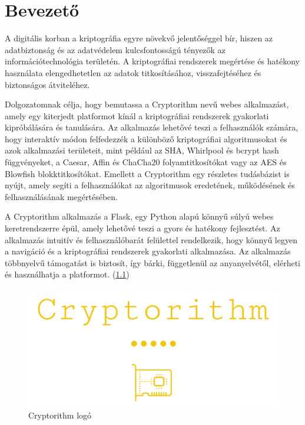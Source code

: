 \chapter{Bevezető}%

A digitális korban a kriptográfia egyre növekvő jelentőséggel bír, hiszen az adatbiztonság és az adatvédelem kulcsfontosságú tényezők az információtechnológia területén. A kriptográfiai rendszerek megértése és hatékony használata elengedhetetlen az adatok titkosításához, visszafejtéséhez és biztonságos átviteléhez.

Dolgozatomnak célja, hogy bemutassa a Cryptorithm nevű webes alkalmazást, amely egy kiterjedt platformot kínál a kriptográfiai rendszerek gyakorlati kipróbálására és tanulására. Az alkalmazás lehetővé teszi a felhasználók számára, hogy interaktív módon felfedezzék a különböző kriptográfiai algoritmusokat és azok alkalmazási területeit, mint például az SHA, Whirlpool és bcrypt hash függvényeket, a Caesar, Affin és ChaCha20 folyamtitkosítókat vagy az AES és Blowfish blokktitkosítókat. Emellett a Cryptorithm egy részletes tudásbázist is nyújt, amely segíti a felhasználókat az algoritmusok eredetének, működésének és felhasználásának megértésében.

A Cryptorithm alkalmazás a Flask, egy Python alapú könnyű súlyú webes keretrendszerre épül, amely lehetővé teszi a gyors és hatékony fejlesztést. Az alkalmazás intuitív és felhasználóbarát felülettel rendelkezik, hogy könnyű legyen a navigáció és a kriptográfiai rendszerek gyakorlati alkalmazása. Az alkalmazás többnyelvű támogatást is biztosít, így bárki, függetlenül az anyanyelvétől, elérheti és használhatja a platformot.  (\ref{fig:logoCryptorithm})

\begin{figure}[!h]
	\centering
	\includegraphics[scale=0.25]{images/logoCryptorithm}
	\caption{Cryptorithm logó}
	\label{fig:logoCryptorithm}
\end{figure}
\pagebreak

